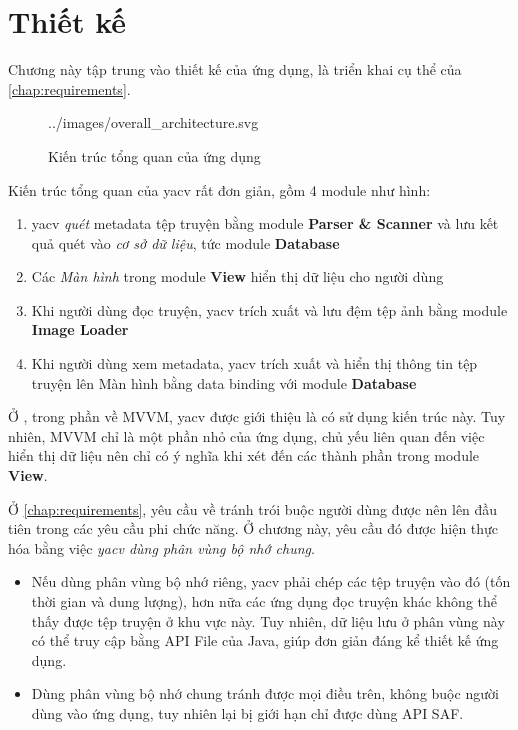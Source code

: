 \documentclass[../../thesis]{subfiles}
\begin{document}
\chapter{Thiết kế}\label{chap:design}

Chương này tập trung vào thiết kế của ứng dụng, là triển khai cụ thể của
\autoref{chap:requirements}.

\begin{figure}[H]
    \centering
    
        {../images/overall_architecture.svg}
    \caption{Kiến trúc tổng quan của ứng dụng}
    \label{fig:overall-architecture}
\end{figure}

Kiến trúc tổng quan của yacv rất đơn giản, gồm 4 module như hình:

\begin{enumerate}
    \item
        yacv \emph{quét} metadata tệp truyện bằng module \textbf{Parser \&
        Scanner} và lưu kết quả quét vào \emph{cơ sở dữ liệu}, tức module
        \textbf{Database}
    \item
        Các \emph{Màn hình} trong module \textbf{View} hiển thị dữ liệu cho
        người dùng
    \item
        Khi người dùng đọc truyện, yacv trích xuất và lưu đệm tệp ảnh bằng
        module \textbf{Image Loader}
    \item
        Khi người dùng xem metadata, yacv trích xuất và hiển thị thông tin tệp
        truyện lên Màn hình bằng data binding với module \textbf{Database}
\end{enumerate}

Ở , trong phần về MVVM, yacv được giới thiệu là có sử
dụng kiến trúc này. Tuy nhiên, MVVM chỉ là một phần nhỏ của ứng dụng, chủ yếu
liên quan đến việc hiển thị dữ liệu nên chỉ có ý nghĩa khi xét đến các thành
phần trong module \textbf{View}.

Ở \autoref{chap:requirements}, yêu cầu về tránh trói buộc người dùng được nên
lên đầu tiên trong các yêu cầu phi chức năng. Ở chương này, yêu cầu đó được hiện
thực hóa bằng việc \emph{yacv dùng phân vùng bộ nhớ chung}.

\begin{itemize}
    \item
        Nếu dùng phân vùng bộ nhớ riêng, yacv phải chép các tệp truyện vào đó
        (tốn thời gian và dung lượng), hơn nữa các ứng dụng đọc truyện khác
        không thể thấy được tệp truyện ở khu vực này. Tuy nhiên, dữ liệu lưu ở
        phân vùng này có thể truy cập bằng API File của Java, giúp đơn giản đáng
        kể thiết kế ứng dụng.
    \item
        Dùng phân vùng bộ nhớ chung tránh được mọi điều trên, không buộc người
        dùng vào ứng dụng, tuy nhiên lại bị giới hạn chỉ được dùng API SAF.
\end{itemize}
\end{document}
